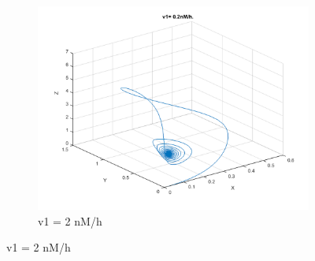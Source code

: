 \documentclass[10pt,a4paper,oneside,twocolumn]{article}
\numberwithin{equation}{section} %
\begin{document}
\begin{figure}
\begin{subfigure}[b]{0.3\textwidth}
	    \includegraphics[width=\textwidth]{LotsofthesameA/A-AA2.png}
	    \caption{v1 = 2 nM/h}
	\end{subfigure}
	 

\end{figure}
\end{document}

